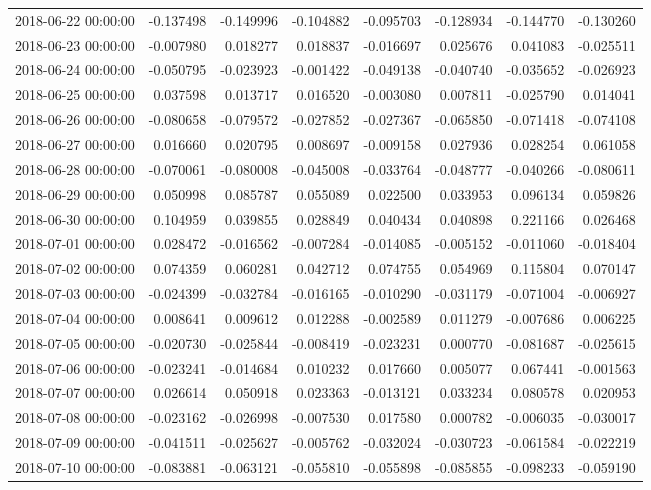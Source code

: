 \begin{tabular}{lrrrrrrr}
2018-06-22 00:00:00 & -0.137498 & -0.149996 & -0.104882 & -0.095703 & -0.128934 & -0.144770 & -0.130260 \\
2018-06-23 00:00:00 & -0.007980 & 0.018277 & 0.018837 & -0.016697 & 0.025676 & 0.041083 & -0.025511 \\
2018-06-24 00:00:00 & -0.050795 & -0.023923 & -0.001422 & -0.049138 & -0.040740 & -0.035652 & -0.026923 \\
2018-06-25 00:00:00 & 0.037598 & 0.013717 & 0.016520 & -0.003080 & 0.007811 & -0.025790 & 0.014041 \\
2018-06-26 00:00:00 & -0.080658 & -0.079572 & -0.027852 & -0.027367 & -0.065850 & -0.071418 & -0.074108 \\
2018-06-27 00:00:00 & 0.016660 & 0.020795 & 0.008697 & -0.009158 & 0.027936 & 0.028254 & 0.061058 \\
2018-06-28 00:00:00 & -0.070061 & -0.080008 & -0.045008 & -0.033764 & -0.048777 & -0.040266 & -0.080611 \\
2018-06-29 00:00:00 & 0.050998 & 0.085787 & 0.055089 & 0.022500 & 0.033953 & 0.096134 & 0.059826 \\
2018-06-30 00:00:00 & 0.104959 & 0.039855 & 0.028849 & 0.040434 & 0.040898 & 0.221166 & 0.026468 \\
2018-07-01 00:00:00 & 0.028472 & -0.016562 & -0.007284 & -0.014085 & -0.005152 & -0.011060 & -0.018404 \\
2018-07-02 00:00:00 & 0.074359 & 0.060281 & 0.042712 & 0.074755 & 0.054969 & 0.115804 & 0.070147 \\
2018-07-03 00:00:00 & -0.024399 & -0.032784 & -0.016165 & -0.010290 & -0.031179 & -0.071004 & -0.006927 \\
2018-07-04 00:00:00 & 0.008641 & 0.009612 & 0.012288 & -0.002589 & 0.011279 & -0.007686 & 0.006225 \\
2018-07-05 00:00:00 & -0.020730 & -0.025844 & -0.008419 & -0.023231 & 0.000770 & -0.081687 & -0.025615 \\
2018-07-06 00:00:00 & -0.023241 & -0.014684 & 0.010232 & 0.017660 & 0.005077 & 0.067441 & -0.001563 \\
2018-07-07 00:00:00 & 0.026614 & 0.050918 & 0.023363 & -0.013121 & 0.033234 & 0.080578 & 0.020953 \\
2018-07-08 00:00:00 & -0.023162 & -0.026998 & -0.007530 & 0.017580 & 0.000782 & -0.006035 & -0.030017 \\
2018-07-09 00:00:00 & -0.041511 & -0.025627 & -0.005762 & -0.032024 & -0.030723 & -0.061584 & -0.022219 \\
2018-07-10 00:00:00 & -0.083881 & -0.063121 & -0.055810 & -0.055898 & -0.085855 & -0.098233 & -0.059190 \\

\end{tabular}
